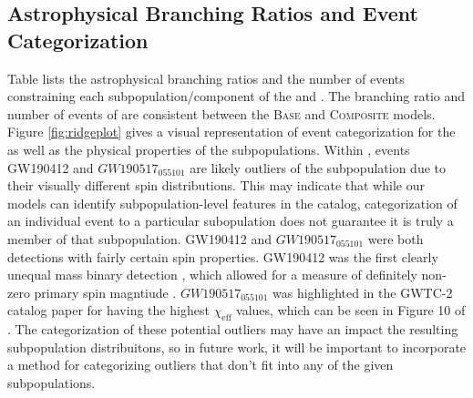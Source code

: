 \subsection{Astrophysical Branching Ratios and Event Categorization}

Table  lists the astrophysical branching ratios and the number of events constraining each subpopulation/component of the \base{} and \comp{}. The branching ratio and number of events of \first{} are consistent between the \textsc{Base} and \textsc{Composite} models. Figure \ref{fig:ridgeplot} gives a visual representation of event categorization for the \comp{} as well as the physical properties of the subpopulations. Within \contA{}, events GW190412 and $GW190517_055101$ are likely outliers of the subpopulation due to their visually different spin distributions. This may indicate that while our models can identify subpopulation-level features in the catalog, categorization of an individual event to a particular subopulation does not guarantee it is truly a member of that subpopulation. GW190412 and $GW190517_055101$ were both detections with fairly certain spin properties. GW190412 was the first clearly unequal mass binary detection , which allowed for a measure of definitely non-zero primary spin magntiude . $GW190517_055101$ was highlighted in the GWTC-2 catalog paper  for having the highest $\chi_\text{eff}$ values, which can be seen in Figure 10 of . The categorization of these potential outliers may have an impact the resulting subpopulation distribuitons, so in future work, it will be important to incorporate a method for categorizing outliers that don't fit into any of the given subpopulations. 

